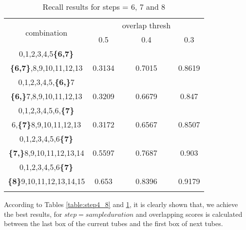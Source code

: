 \begin{center}
\begin{longtable}{||c||c c c||}

  \hline
  \multirow{2}{5em}{combination} & {} &overlap thresh & {} \\
                                    &   0.5  &  0.4 &  0.3 \\         
  \hline  \hline
  0,1,2,3,4,5\textbf{\{6,7\}}           & {} & {} & {} \\
  \textbf{\{6,7\}},8,9,10,11,12,13      & 0.3134  & 0.7015 & 0.8619 \\
  \hline     \hline                          

  0,1,2,3,4,5,\textbf{\{6,\}}7          & {} & {} & {} \\
  \textbf{\{6,\}}7,8,9,10,11,12,13      & 0.3209  & 0.6679 & 0.847 \\
  \hline                          
  0,1,2,3,4,5,6,\textbf{\{7\}}          & {} & {} & {} \\
  6,\textbf{\{7\}}8,9,10,11,12,13       & 0.3172  & 0.6567 & 0.8507 \\
  \hline                          
  0,1,2,3,4,5,6\textbf{\{7\}}           & {} & {} & {} \\
  \textbf{\{7,\}}8,9,10,11,12,13,14     & 0.5597  & 0.7687 & 0.903 \\
  \hline                           
  0,1,2,3,4,5,6\textbf{\{7\}}           & {} & {} & {} \\
  \textbf{\{8\}}9,10,11,12,13,14,15     & 0.653	  & 0.8396 &0.9179  \\
  \hline                           
  \caption{Recall results for steps = 6, 7 and 8}
  \label{table:step8_678 }
\end{longtable} 
\end{center}

According to Tables \ref{table:step4_8} and \ref{table:step8_678 }, it is clearly shown that, we achieve the  best results, for $step = sample duration$ and overlapping scores is calculated between the last box of the current tubes and the first box of next tubes.

